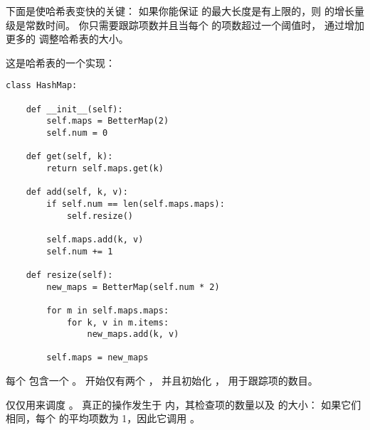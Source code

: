 
下面是使哈希表变快的关键：
如果你能保证  的最大长度是有上限的，则  的增长量级是常数时间。
你只需要跟踪项数并且当每个  的项数超过一个阈值时，
通过增加更多的  调整哈希表的大小。


这是哈希表的一个实现：

\begin{lstlisting}
class HashMap:

    def __init__(self):
        self.maps = BetterMap(2)
        self.num = 0

    def get(self, k):
        return self.maps.get(k)

    def add(self, k, v):
        if self.num == len(self.maps.maps):
            self.resize()

        self.maps.add(k, v)
        self.num += 1

    def resize(self):
        new_maps = BetterMap(self.num * 2)

        for m in self.maps.maps:
            for k, v in m.items:
                new_maps.add(k, v)

        self.maps = new_maps
\end{lstlisting}


每个  包含一个 。
 开始仅有两个 ， 并且初始化 ， 用于跟踪项的数目。


 仅仅用来调度 。
真正的操作发生于  内，其检查项的数量以及  的大小：
如果它们相同，每个  的平均项数为 1，因此它调用 。

